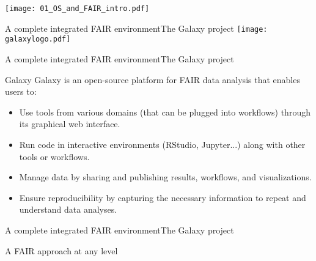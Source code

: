 \begin{frame}
\centering\texttt{[image: 01\_OS\_and\_FAIR\_intro.pdf]}
\end{frame}


\begin{frame}{A complete integrated FAIR environment}{The Galaxy project}
\centering\texttt{[image: galaxylogo.pdf]}
\end{frame}

\begin{frame}{A complete integrated FAIR environment}{The Galaxy project}
\begin{block}{Galaxy}
Galaxy is an open-source platform for FAIR data analysis that enables users to:
\begin{itemize}
\item Use tools from various domains (that can be plugged into workflows) through its graphical web interface.
\item Run code in interactive environments (RStudio, Jupyter...) along with other tools or workflows.
\item Manage data by sharing and publishing results, workflows, and visualizations.
\item Ensure reproducibility by capturing the necessary information to repeat and understand data analyses.
\end{itemize}
\end{block}
\end{frame}


\begin{frame}{A complete integrated FAIR environment}{The Galaxy project}
\end{frame}

\begin{frame}{A FAIR approach at any level}
\end{frame}
